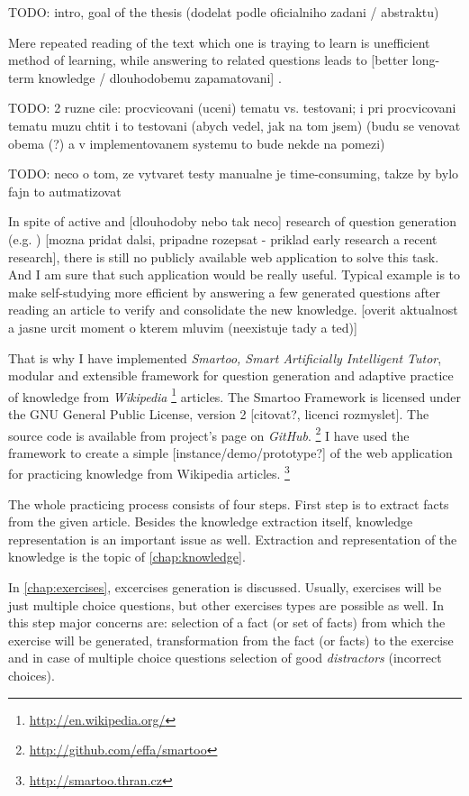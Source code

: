 \documentclass[a4paper, 12pt, twoside]{fithesis2}		%
\renewcommand{\_}{\leavevmode \kern0.07em\vbox{\hrule width0.4em}}
\newcounter{choice}
\begin{document}
TODO: intro, goal of the thesis (dodelat podle oficialniho zadani / abstraktu)

Mere repeated reading of the text which one is traying to learn is unefficient method of learning, while answering to related questions leads to [better long-term knowledge / dlouhodobemu zapamatovani] \parencite{edu-improve}.

TODO: 2 ruzne cile: procvicovani (uceni) tematu vs. testovani; i pri procvicovani tematu muzu chtit i to testovani (abych vedel, jak na tom jsem) (budu se venovat obema (?) a v implementovanem systemu to bude nekde na pomezi)

TODO: neco o tom, ze vytvaret testy manualne je time-consuming, takze by bylo fajn to autmatizovat

In spite of active and [dlouhodoby nebo tak neco] research of question generation
(e.g. \parencite{questions-wolfe, questions-eval}) [mozna pridat dalsi, pripadne rozepsat - priklad early research a recent research],
there is still no publicly available web application to solve this task.
And I am sure that such application would be really useful. Typical example is to make self-studying more efficient by answering a few generated questions after reading an article to verify and consolidate the new knowledge.
[overit aktualnost a jasne urcit moment o kterem mluvim (neexistuje tady a ted)]

That is why I have implemented \textit{Smartoo, Smart Artificially Intelligent Tutor}, modular and extensible framework for question generation and adaptive practice
of knowledge from \emph{Wikipedia}%
\footnote{\url{http://en.wikipedia.org/}}
articles.
The Smartoo Framework is licensed under the GNU General Public License, version 2 [citovat?, licenci rozmyslet].
The source code is available from project's page on \textit{GitHub}.%
\footnote{\url{http://github.com/effa/smartoo}}
I have used the framework to create a simple [instance/demo/prototype?] of the web application for practicing knowledge from Wikipedia articles.%
\footnote{\url{http://smartoo.thran.cz}}

The whole practicing process consists of four steps.
First step is to extract facts from the given article.
Besides the knowledge extraction itself, knowledge representation is an important issue as well.
Extraction and representation of the knowledge is the topic of \autoref{chap:knowledge}.

In \autoref{chap:exercises}, excercises generation is discussed.
Usually, exercises will be just multiple choice questions, but other exercises types are possible as well.
In this step major concerns are: selection of a fact (or set of facts) from which the exercise will be generated, transformation from the fact (or facts) to the exercise and in case of multiple choice questions selection of good \textit{distractors} (incorrect choices).
\end{document}
